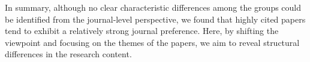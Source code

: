 In summary, although no clear characteristic differences among the groups could be identified from the journal‑level perspective, we found that highly cited papers tend to exhibit a relatively strong journal preference. Here, by shifting the viewpoint and focusing on the themes of the papers, we aim to reveal structural differences in the research content.
